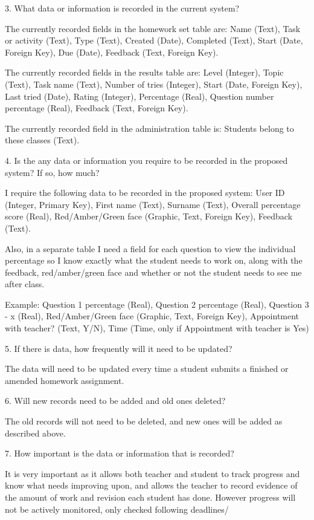 3. What data or information is recorded in the current system?

The currently recorded fields in the homework set table are: Name (Text), Task or activity (Text), Type (Text), Created (Date), Completed (Text), Start (Date, Foreign Key), Due (Date), Feedback (Text, Foreign Key).

The currently recorded fields in the results table are: Level (Integer), Topic (Text), Task name (Text), Number of tries (Integer), Start (Date, Foreign Key), Last tried (Date), Rating (Integer), Percentage (Real), Question number percentage (Real), Feedback (Text, Foreign Key).

The currently recorded field in the administration table is: Students belong to these classes (Text).

4. Is the any data or information you require to be recorded in the proposed system? If so, how much?

I require the following data to be recorded in the proposed system: User ID (Integer, Primary Key), First name (Text), Surname (Text), Overall percentage score (Real), Red/Amber/Green face (Graphic, Text, Foreign Key), Feedback (Text).

Also, in a separate table I need a field for each question to view the individual percentage so I know exactly what the student needs to work on, along with the feedback, red/amber/green face and whether or not the student needs to see me after class. 

Example: Question 1 percentage (Real), Question 2 percentage (Real), Question 3 - x (Real), Red/Amber/Green face (Graphic, Text, Foreign Key), Appointment with teacher? (Text, Y/N), Time (Time, only if Appointment with teacher is Yes)

5. If there is data, how frequently will it need to be updated?

The data will need to be updated every time a student submits a finished or amended homework assignment.

6. Will new records need to be added and old ones deleted?

The old records will not need to be deleted, and new ones will be added as described above.

7. How important is the data or information that is recorded?

It is very important as it allows both teacher and student to track progress and know what needs improving upon, and allows the teacher to record evidence of the amount of work and revision each student has done. However progress will not be actively monitored, only checked following deadlines/

